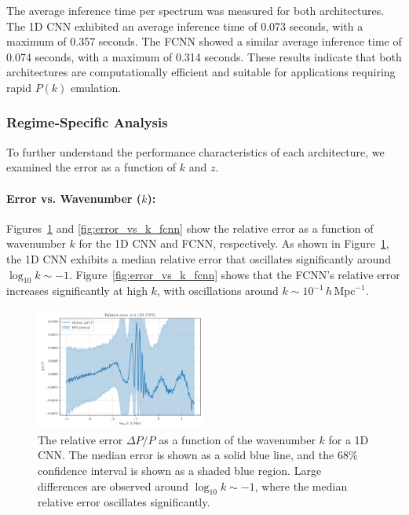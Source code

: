 \documentclass[twocolumn]{aastex631}
\begin{document}
The average inference time per spectrum was measured for both architectures. The 1D CNN exhibited an average inference time of 0.073 seconds, with a maximum of 0.357 seconds. The FCNN showed a similar average inference time of 0.074 seconds, with a maximum of 0.314 seconds. These results indicate that both architectures are computationally efficient and suitable for applications requiring rapid $P(k)$ emulation.

\subsubsection{Regime-Specific Analysis}

To further understand the performance characteristics of each architecture, we examined the error as a function of $k$ and $z$.

\paragraph{Error vs. Wavenumber ($k$):}

Figures~\ref{fig:error_vs_k_cnn1d} and \ref{fig:error_vs_k_fcnn} show the relative error as a function of wavenumber $k$ for the 1D CNN and FCNN, respectively. As shown in Figure~\ref{fig:error_vs_k_cnn1d}, the 1D CNN exhibits a median relative error that oscillates significantly around $\log_{10} k \sim -1$. Figure~\ref{fig:error_vs_k_fcnn} shows that the FCNN's relative error increases significantly at high $k$, with oscillations around $k \sim 10^{-1}\,h\,\mathrm{Mpc}^{-1}$.

\begin{figure}[h]
    \centering
    \includegraphics[width=0.5\textwidth]{plots/error_vs_k_cnn1d_3_1745408317.png}
    \caption{\label{fig:error_vs_k_cnn1d}The relative error $\Delta P/P$ as a function of the wavenumber $k$ for a 1D CNN. The median error is shown as a solid blue line, and the 68\% confidence interval is shown as a shaded blue region. Large differences are observed around $\log_{10} k \sim -1$, where the median relative error oscillates significantly.}
\end{figure}
\end{document}
